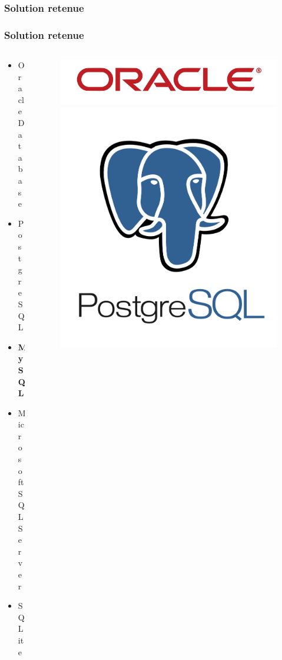 \subsubsection[Solution retenue]{Solution retenue}
\begin{frame}
\frametitle{Solution retenue}
\begin{columns}
\begin{column}{5cm}
\begin{itemize}
	\item Oracle Database
	\item PostgreSQL
	\item \textbf{MySQL}
	\item Microsoft SQL Server
	\item SQLite
\end{itemize}
\end{column}
\begin{column}{7cm}
\begin{figure}
\includegraphics[scale=0.038]{Images/Oracle}
\includegraphics[scale=0.18]{Images/PostgreSQL}\\

\end{figure}
\end{column}
\end{columns}
\end{frame}
